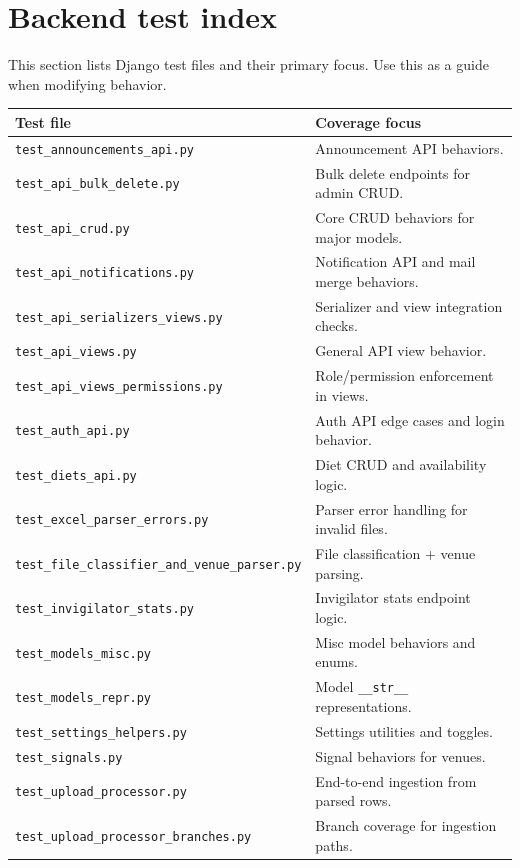 \section{Backend test index}
\label{sec:tests:backend:index}

This section lists Django test files and their primary focus. Use this as a guide when modifying behavior.

\begin{longtable}{p{}p{}}
\toprule
\textbf{Test file} & \textbf{Coverage focus} \\
\midrule
\texttt{test\_announcements\_api.py} & Announcement API behaviors. \\
\texttt{test\_api\_bulk\_delete.py} & Bulk delete endpoints for admin CRUD. \\
\texttt{test\_api\_crud.py} & Core CRUD behaviors for major models. \\
\texttt{test\_api\_notifications.py} & Notification API and mail merge behaviors. \\
\texttt{test\_api\_serializers\_views.py} & Serializer and view integration checks. \\
\texttt{test\_api\_views.py} & General API view behavior. \\
\texttt{test\_api\_views\_permissions.py} & Role/permission enforcement in views. \\
\texttt{test\_auth\_api.py} & Auth API edge cases and login behavior. \\
\texttt{test\_diets\_api.py} & Diet CRUD and availability logic. \\
\texttt{test\_excel\_parser\_errors.py} & Parser error handling for invalid files. \\
\texttt{test\_file\_classifier\_and\_venue\_parser.py} & File classification + venue parsing. \\
\texttt{test\_invigilator\_stats.py} & Invigilator stats endpoint logic. \\
\texttt{test\_models\_misc.py} & Misc model behaviors and enums. \\
\texttt{test\_models\_repr.py} & Model \texttt{\_\_str\_\_} representations. \\
\texttt{test\_settings\_helpers.py} & Settings utilities and toggles. \\
\texttt{test\_signals.py} & Signal behaviors for venues. \\
\texttt{test\_upload\_processor.py} & End-to-end ingestion from parsed rows. \\
\texttt{test\_upload\_processor\_branches.py} & Branch coverage for ingestion paths. \\

\end{longtable}
